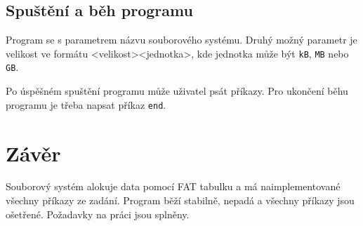 \documentclass[12pt]{report}
\begin{document}
	\subsection*{Spuštění a běh programu}
	\par Program se s parametrem názvu souborového systému. Druhý možný parametr je velikost ve formátu <velikost><jednotka>, kde jednotka může být \texttt{kB},  \texttt{MB} nebo \texttt{GB}.\\
	\par Po úspěšném spuštění programu může uživatel psát příkazy. Pro ukončení běhu programu je třeba napsat příkaz \texttt{end}.
	
	\section*{Závěr}
	\par Souborový systém alokuje data pomocí FAT tabulku a má naimplementované všechny příkazy ze zadání. Program běží stabilně, nepadá a všechny příkazy jsou ošetřené. Požadavky na práci jsou splněny.
	
\end{document}
